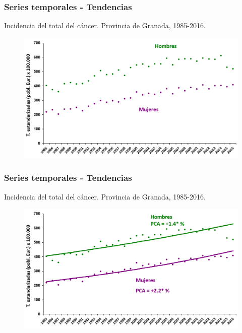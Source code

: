 \documentclass{beamer}
\begin{document}
\begin{frame}\frametitle{Series temporales - Tendencias}
	
	\centering
	Incidencia del total del cáncer. Provincia de Granada, 1985-2016.
	\begin{figure}
		\centering
		\includegraphics[width=\textwidth]{images/tendencias0.png}
	\end{figure}
	
\end{frame}


\begin{frame}\frametitle{Series temporales - Tendencias}
	
	\centering
	Incidencia del total del cáncer. Provincia de Granada, 1985-2016.
	\begin{figure}
		\centering
		\includegraphics[width=\textwidth]{images/tendencias1.png}
	\end{figure}
	
\end{frame}
\end{document}
